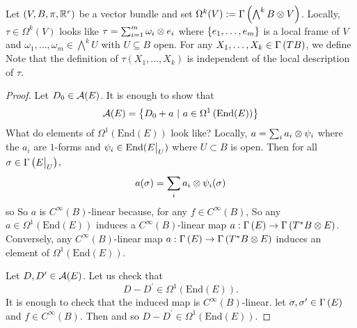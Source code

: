 \documentclass[main.tex]{subfiles}
\begin{document}
\begin{note}
Let $(V, B, \pi, \mathbb{R}^r)$ be a vector bundle and set $\Omega^k(V) := \Gamma\left( \bigwedge^k B \otimes V \right)$. Locally, $\tau \in \Omega^k(V)$ looks like $\tau = \sum_{i=1}^m \omega_i \otimes e_i$ where $\left\{e_1,\dots, e_m\right\}$ is a local frame of $V$ and $\omega_1, \dots, \omega_m \in \bigwedge^{k}U$ with $U \subseteq B$ open. For any $X_1, \dots, X_k \in \Gamma\left( TB \right)$, we define
Note that the definition of $\tau(X_1,\dots, X_k)$ is independent of the local description of $\tau$. 
\end{note}

\begin{proof}
    
    Let $D_0 \in \mathcal{A}(E)$. It is enough to show that 
\[
\mathcal{A}(E) = \left\{ D_0 + a \ | \  a \in \Omega^1\left( \text{End}(E) \right)  \right\}
\]
What do elements of $\Omega^1(\text{End}(E))$ look like? Locally, $a = \sum_{i}a_i \otimes \psi_i$ where the $a_i$ are $1$-forms and $\psi_i \in \text{End}(E\big|_{U})$ where $U \subset B$ is open. Then for all $\sigma \in \Gamma\left( E\big|_{U} \right)$,
\[
a(\sigma) = \sum_i a_i \otimes \psi_i(\sigma)
\]
so
So $a$ is $C^\infty(B)$-linear because, for any $f \in C^\infty(B)$, 
So any $a \in \Omega^1(\text{End}(E))$ induces a $C^\infty(B)$-linear map $a : \Gamma\left( E \right) \to \Gamma\left( T^*B \otimes E \right)$. Conversely, any $C^\infty(B)$-linear map $a: \Gamma\left( E \right) \to \Gamma\left( T^*B\otimes E \right)$ induces an element of $\Omega^1(\text{End}(E))$.

Let $D, D^\prime \in \mathcal{A}(E)$. Let us check that \[
D - D^\prime \in \Omega^1(\text{End}(E)).  
\]
It is enough to check that the induced map 
is $C^\infty(B)$-linear. let $\sigma, \sigma^\prime \in \Gamma\left( E \right)$ and $f \in C^\infty(B)$. Then
and so $D - D^\prime \in \Omega^1(\text{End}(E))$.

\end{proof}
\end{document}
